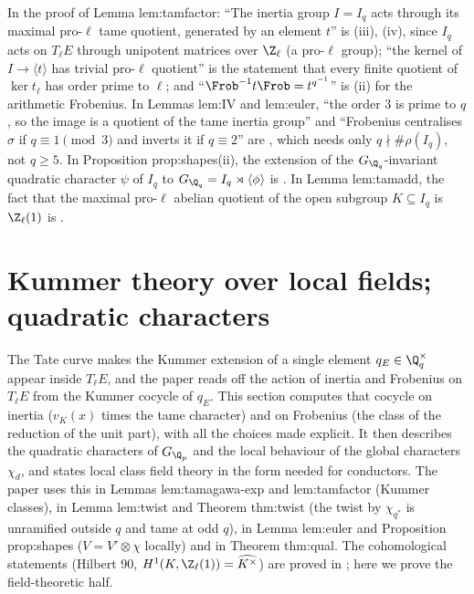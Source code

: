 \begin{paperlink}\label{pl:local:tamfactor-tame}
In the proof of Lemma lem:tamfactor: ``The inertia group $I=I_q$ acts through its maximal pro-$\ell$ tame quotient, generated by an element $t$'' is
(iii), (iv), since $I_q$ acts on $T_\ell E$ through unipotent matrices over $\Z_\ell$ (a pro-$\ell$ group); ``the kernel of
$I\to\langle t\rangle$ has trivial pro-$\ell$ quotient'' is the statement that every finite quotient of $\ker t_\ell$ has order prime to $\ell$; and
``$\Frob^{-1}t\Frob=t^{q^{-1}}$'' is (ii) for the arithmetic Frobenius. In Lemmas lem:IV and lem:euler, ``the order $3$ is prime
to $q$, so the image is a quotient of the tame inertia group'' and ``Frobenius centralises $\sigma$ if $q\equiv1\pmod3$ and inverts it if $q\equiv2$'' are
, which needs only $q\nmid\#\rho(I_q)$, not $q\ge5$. In Proposition prop:shapes(ii), the extension of the
$G_{\Q_q}$-invariant quadratic character $\psi$ of $I_q$ to $G_{\Q_q}=I_q\rtimes\langle\phi\rangle$ is . In Lemma lem:tamadd, the fact that the maximal
pro-$\ell$ abelian quotient of the open subgroup $K\subseteq I_q$ is $\Z_\ell(1)$ is .
\end{paperlink}

\section{Kummer theory over local fields; quadratic characters}\label{sec:local:kummer}

The Tate curve makes the Kummer extension of a single element $q_E\in\Q_q^\times$ appear inside $T_\ell E$, and the paper reads off the action of
inertia and Frobenius on $T_\ell E$ from the Kummer cocycle of $q_E$. This section computes that cocycle on inertia ($v_K(x)$ times the tame
character) and on Frobenius (the class of the reduction of the unit part), with all the choices made explicit. It then describes the
quadratic characters of $G_{\Q_p}$ and the local behaviour of the global characters $\chi_d$, and states local class field theory in the form
needed for conductors. The paper uses this in Lemmas lem:tamagawa-exp and lem:tamfactor (Kummer classes), in Lemma lem:twist and Theorem
thm:twist (the twist by $\chi_{q^*}$ is unramified outside $q$ and tame at odd $q$), in Lemma lem:euler and Proposition prop:shapes ($V=V'\otimes\chi$
locally) and in Theorem thm:qual. The cohomological statements (Hilbert 90, $H^1(K,\Z_\ell(1))=\widehat{K^\times}$) are proved in ;
here we prove the field-theoretic half.

